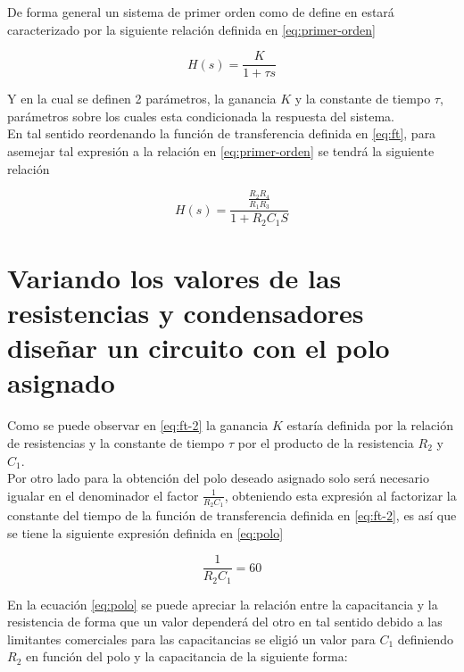 \documentclass[conference]{IEEEtran}
\begin{document}
	De forma general un sistema de primer orden como de define en \cite{ogata2015} estará caracterizado por la siguiente relación definida en \ref{eq:primer-orden}
	
	\begin{equation}
		H(s) = \frac{K}{1 + \tau s }
		\label{eq:primer-orden}
	\end{equation}
	
	Y en la cual se definen 2 parámetros, la ganancia $K$ y la constante de tiempo $\tau$, parámetros sobre los cuales esta condicionada la respuesta del sistema. \\
	
	En tal sentido reordenando la función de transferencia definida en \ref{eq:ft}, para asemejar tal expresión a la relación en \ref{eq:primer-orden} se tendrá la siguiente relación
	
	\begin{equation}
		H(s) = \frac{ \frac{R_2 R_4}{R_1 R_3} }{1 + R_2 C_1 S}
		\label{eq:ft-2}
	\end{equation}
	
	\section{Variando los valores de las resistencias y condensadores diseñar un circuito con el polo asignado}
	
	Como se puede observar en \ref{eq:ft-2} la ganancia $K$ estaría definida por la relación de resistencias y la constante de tiempo $\tau$ por el producto de la resistencia $R_2$ y $C_1$. \\
	
	Por otro lado para la obtención del polo deseado asignado solo será necesario igualar en el denominador el factor $\frac{1}{R_2 C_1}$, obteniendo esta expresión al factorizar la constante del tiempo de la función de transferencia definida en \ref{eq:ft-2}, es así que se tiene la siguiente expresión definida en \ref{eq:polo}
	
	\begin{equation}
		\frac{1}{R_2 C_1} = 60
		\label{eq:polo}
	\end{equation}
	
	En la ecuación \ref{eq:polo} se puede apreciar la relación entre la capacitancia y la resistencia de forma que un valor dependerá del otro en tal sentido debido a las limitantes comerciales para las capacitancias se eligió un valor para $C_1$ definiendo $R_2$ en función del polo y la capacitancia de la siguiente forma:
	
\end{document}
